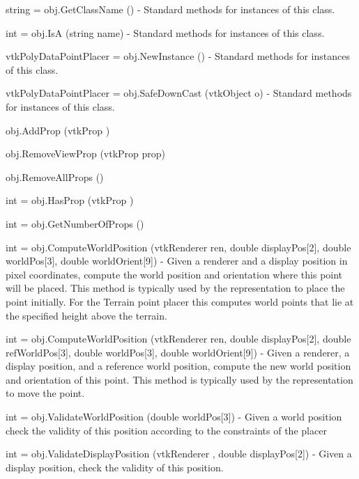 \begin{DoxyItemize}
\item {\ttfamily string = obj.\-Get\-Class\-Name ()} -\/ Standard methods for instances of this class.  
\item {\ttfamily int = obj.\-Is\-A (string name)} -\/ Standard methods for instances of this class.  
\item {\ttfamily vtk\-Poly\-Data\-Point\-Placer = obj.\-New\-Instance ()} -\/ Standard methods for instances of this class.  
\item {\ttfamily vtk\-Poly\-Data\-Point\-Placer = obj.\-Safe\-Down\-Cast (vtk\-Object o)} -\/ Standard methods for instances of this class.  
\item {\ttfamily obj.\-Add\-Prop (vtk\-Prop )}  
\item {\ttfamily obj.\-Remove\-View\-Prop (vtk\-Prop prop)}  
\item {\ttfamily obj.\-Remove\-All\-Props ()}  
\item {\ttfamily int = obj.\-Has\-Prop (vtk\-Prop )}  
\item {\ttfamily int = obj.\-Get\-Number\-Of\-Props ()}  
\item {\ttfamily int = obj.\-Compute\-World\-Position (vtk\-Renderer ren, double display\-Pos\mbox{[}2\mbox{]}, double world\-Pos\mbox{[}3\mbox{]}, double world\-Orient\mbox{[}9\mbox{]})} -\/ Given a renderer and a display position in pixel coordinates, compute the world position and orientation where this point will be placed. This method is typically used by the representation to place the point initially. For the Terrain point placer this computes world points that lie at the specified height above the terrain.  
\item {\ttfamily int = obj.\-Compute\-World\-Position (vtk\-Renderer ren, double display\-Pos\mbox{[}2\mbox{]}, double ref\-World\-Pos\mbox{[}3\mbox{]}, double world\-Pos\mbox{[}3\mbox{]}, double world\-Orient\mbox{[}9\mbox{]})} -\/ Given a renderer, a display position, and a reference world position, compute the new world position and orientation of this point. This method is typically used by the representation to move the point.  
\item {\ttfamily int = obj.\-Validate\-World\-Position (double world\-Pos\mbox{[}3\mbox{]})} -\/ Given a world position check the validity of this position according to the constraints of the placer  
\item {\ttfamily int = obj.\-Validate\-Display\-Position (vtk\-Renderer , double display\-Pos\mbox{[}2\mbox{]})} -\/ Given a display position, check the validity of this position.  

\end{DoxyItemize}
